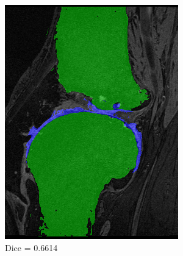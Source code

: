 \documentclass[a4paper,12pt]{article}
\begin{document}
\begin{figure}[H]
    \centering

    \begin{subfigure}[b]{0.32\linewidth}
    \includegraphics[width=\linewidth]{final_SPEP_worst.png}
    \caption{Dice = 0.6614}
    \end{subfigure}
    \begin{subfigure}[b]{0.32\linewidth}

\end{subfigure}
\end{figure}
\end{document}

